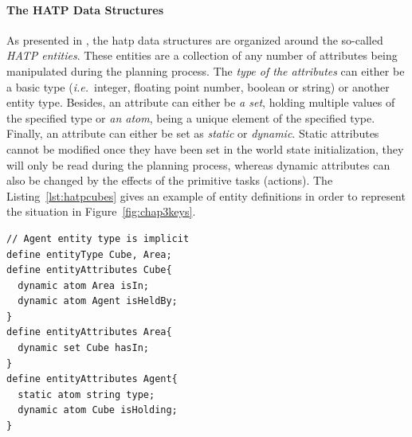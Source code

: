 \documentclass[a4paper,11pt,twoside]{StyleThese}
\begin{document}

\paragraph{The HATP Data Structures}
As presented in \cite{de2015hatp}, the \acrshort{hatp} data structures are organized around the so-called \textit{HATP entities}. These entities are a collection of any number of attributes being manipulated during the planning process. The \textit{type of the attributes} can either be a basic type (\textit{i.e.}~integer, floating point number, boolean or string) or another entity type. Besides, an attribute can either be \textit{a set}, holding multiple values of the specified type or \textit{an atom}, being a unique element of the specified type. Finally, an attribute can either be set as \textit{static} or \textit{dynamic}. Static attributes cannot be modified once they have been set in the world state initialization, they will only be read during the planning process, whereas dynamic attributes can also be changed by the effects of the primitive tasks (actions). The Listing~\ref{lst:hatpcubes} gives an example of entity definitions in order to represent the situation in Figure~\ref{fig:chap3keys}.

\begin{lstlisting}[caption={Example of a part of the HATP domain describing the situation of Figure~\ref{fig:chap3keys}.}, label={lst:hatpcubes}, emph={define, entityType, entityAttributes, dynamic, atom, set, static}, emphstyle={\bfseries}, captionpos=b, frame=single]
// Agent entity type is implicit
define entityType Cube, Area;
define entityAttributes Cube{
  dynamic atom Area isIn;
  dynamic atom Agent isHeldBy;
}
define entityAttributes Area{
  dynamic set Cube hasIn;
}
define entityAttributes Agent{
  static atom string type;
  dynamic atom Cube isHolding;
}
\end{lstlisting}
\end{document}
